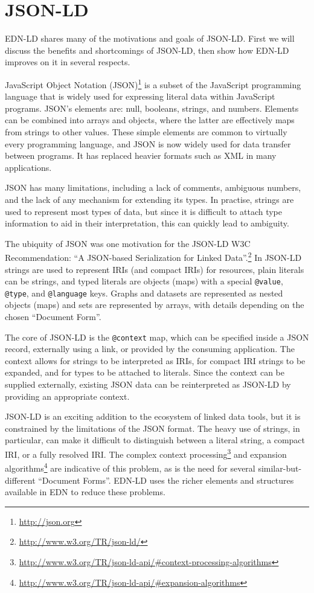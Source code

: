 \documentclass{icbo}
\begin{document}
\section{JSON-LD}

EDN-LD shares many of the motivations and goals of JSON-LD. First we will discuss the benefits and shortcomings of JSON-LD, then show how EDN-LD improves on it in several respects.

JavaScript Object Notation (JSON)\footnote{\url{http://json.org}} is a subset of the JavaScript programming language that is widely used for expressing literal data within JavaScript programs. JSON's elements are: null, booleans, strings, and numbers. Elements can be combined into arrays and objects, where the latter are effectively maps from strings to other values. These simple elements are common to virtually every programming language, and JSON is now widely used for data transfer between programs. It has replaced heavier formats such as XML in many applications.

JSON has many limitations, including a lack of comments, ambiguous numbers, and the lack of any mechanism for extending its types. In practise, strings are used to represent most types of data, but since it is difficult to attach type information to aid in their interpretation, this can quickly lead to ambiguity.

The ubiquity of JSON was one motivation for the JSON-LD W3C Recommendation: ``A JSON-based Serialization for Linked Data''.\footnote{\url{http://www.w3.org/TR/json-ld/}} In JSON-LD strings are used to represent IRIs (and compact IRIs) for resources, plain literals can be strings, and typed literals are objects (maps) with a special {\tt @value}, {\tt @type}, and {\tt @language} keys. Graphs and datasets are represented as nested objects (maps) and sets are represented by arrays, with details depending on the chosen ``Document Form''.

The core of JSON-LD is the {\tt @context} map, which can be specified inside a JSON record, externally using a link, or provided by the consuming application. The context allows for strings to be interpreted as IRIs, for compact IRI strings to be expanded, and for types to be attached to literals. Since the context can be supplied externally, existing JSON data can be reinterpreted as JSON-LD by providing an appropriate context.

JSON-LD is an exciting addition to the ecosystem of linked data tools, but it is constrained by the limitations of the JSON format. The heavy use of strings, in particular, can make it difficult to distinguish between a literal string, a compact IRI, or a fully resolved IRI.
The complex context processing\footnote{\url{http://www.w3.org/TR/json-ld-api/\#context-processing-algorithms}}
and expansion algorithms\footnote{\url{http://www.w3.org/TR/json-ld-api/\#expansion-algorithms}}
are indicative of this problem, as is the need for several similar-but-different ``Document Forms''. EDN-LD uses the richer elements and structures available in EDN to reduce these problems.
\end{document}
